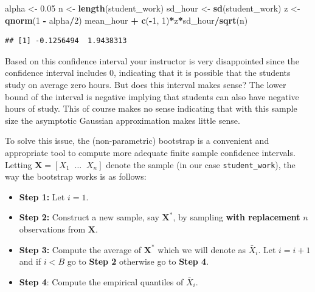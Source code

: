 \documentclass[12pt,]{krantz}
\newenvironment{Shaded}{\begin{snugshade}}{\end{snugshade}}
\newcommand{\KeywordTok}[1]{\textcolor[rgb]{0.27,0.27,0.27}{\textbf{#1}}}
\newcommand{\DecValTok}[1]{\textcolor[rgb]{0.06,0.06,0.06}{#1}}
\newcommand{\FloatTok}[1]{\textcolor[rgb]{0.06,0.06,0.06}{#1}}
\newcommand{\StringTok}[1]{\textcolor[rgb]{0.5,0.5,0.5}{#1}}
\newcommand{\OperatorTok}[1]{\textcolor[rgb]{0.43,0.43,0.43}{\textbf{#1}}}
\newcommand{\NormalTok}[1]{#1}
\providecommand{\tightlist}{%
  \setlength{\itemsep}{0pt}\setlength{\parskip}{0pt}}
\begin{document}
\begin{Shaded}
\begin{Highlighting}[]
\NormalTok{alpha <-}\StringTok{ }\FloatTok{0.05}
\NormalTok{n <-}\StringTok{ }\KeywordTok{length}\NormalTok{(student_work)}
\NormalTok{sd_hour <-}\StringTok{ }\KeywordTok{sd}\NormalTok{(student_work)}
\NormalTok{z <-}\StringTok{ }\KeywordTok{qnorm}\NormalTok{(}\DecValTok{1} \OperatorTok{-}\StringTok{ }\NormalTok{alpha}\OperatorTok{/}\DecValTok{2}\NormalTok{)}
\NormalTok{mean_hour }\OperatorTok{+}\StringTok{ }\KeywordTok{c}\NormalTok{(}\OperatorTok{-}\DecValTok{1}\NormalTok{, }\DecValTok{1}\NormalTok{)}\OperatorTok{*}\NormalTok{z}\OperatorTok{*}\NormalTok{sd_hour}\OperatorTok{/}\KeywordTok{sqrt}\NormalTok{(n)}
\end{Highlighting}
\end{Shaded}

\begin{verbatim}
## [1] -0.1256494  1.9438313
\end{verbatim}

Based on this confidence interval your instructor is very disappointed
since the confidence interval includes 0, indicating that it is possible
that the students study on average zero hours. But does this interval
makes sense? The lower bound of the interval is negative implying that
students can also have negative hours of study. This of course makes no
sense indicating that with this sample size the asymptotic Gaussian
approximation makes little sense.

To solve this issue, the (non-parametric) bootstrap is a convenient and
appropriate tool to compute more adequate finite sample confidence
intervals. Letting
\(\mathbf{X} = \left[X_1 \;\; \ldots \;\; X_n\right]\) denote the sample
(in our case \texttt{student\_work}), the way the bootstrap works is as
follows:

\begin{itemize}
\tightlist
\item
  \textbf{Step 1:} Let \(i = 1\).
\item
  \textbf{Step 2:} Construct a new sample, say \(\mathbf{X}^*\), by
  sampling \textbf{with replacement} \(n\) observations from
  \(\mathbf{X}\).
\item
  \textbf{Step 3:} Compute the average of \(\mathbf{X}^*\) which we will
  denote as \(\bar{X}_i\). Let \(i = i + 1\) and if \(i < B\) go to
  \textbf{Step 2} otherwise go to \textbf{Step 4}.
\item
  \textbf{Step 4}: Compute the empirical quantiles of \(\bar{X}_i\).
\end{itemize}
\end{document}
